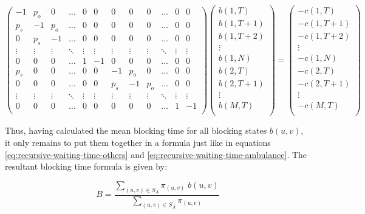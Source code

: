 \begin{equation}\label{eq:general-algebaric-approach-blocking-time}
    \begin{pmatrix}
        -1 & p_o & 0 & \dots & 0 & 0 & 0 & 0 & 0 & \dots & 0 & 0 \\ %
        p_s & -1 & p_o & \dots & 0 & 0 & 0 & 0 & 0 & \dots & 0 & 0 \\ %
        0 & p_s & -1 & \dots & 0 & 0 & 0 & 0 & 0 & \dots & 0 & 0 \\ %
        \vdots & \vdots & \vdots & \ddots & \vdots & \vdots & \vdots & \vdots & 
        \vdots & \ddots & \vdots & \vdots \\ 
        0 & 0 & 0 & \dots & 1 & -1 & 0 & 0 & 0 & \dots & 0 & 0 \\ %
        p_s & 0 & 0 & \dots & 0 & 0 & -1 & p_o & 0 & \dots & 0 & 0 \\ %
        0 & 0 & 0 & \dots & 0 & 0 & p_s & -1 & p_o & \dots & 0 & 0 \\ %
        \vdots & \vdots & \vdots & \ddots & \vdots & \vdots & \vdots & \vdots & 
        \vdots & \ddots & \vdots & \vdots \\ 
        0 & 0 & 0 & \dots & 0 & 0 & 0 & 0 & 0 & \dots & 1 & -1 \\ %
    \end{pmatrix}
    \begin{pmatrix}
        b(1,T) \\
        b(1,T+1) \\
        b(1,T+2) \\
        \vdots \\
        b(1,N) \\
        b(2,T) \\
        b(2,T+1) \\
        \vdots \\
        b(M,T) \\
    \end{pmatrix}
    = 
    \begin{pmatrix}
        -c(1,T) \\
        -c(1,T+1) \\
        -c(1,T+2) \\
        \vdots \\
        -c(1,N) \\
        -c(2,T) \\
        -c(2,T+1) \\
        \vdots \\
        -c(M,T) \\
    \end{pmatrix}
\end{equation}

Thus, having calculated the mean blocking time for all blocking states \(b(u,v)\), 
it only remains to put them together in a formula just like in equations 
\ref{eq:recursive-waiting-time-others} and \ref{eq:recursive-waiting-time-ambulance}.
The resultant blocking time formula is given by:

\begin{equation}\label{eq:algebraic-blocking-time}
    B = \frac{\sum_{(u,v) \in S_A} \pi_{(u,v)} \; b(u,v)}{\sum_{(u,v) \in S_A} \pi_{(u,v)}}
\end{equation}